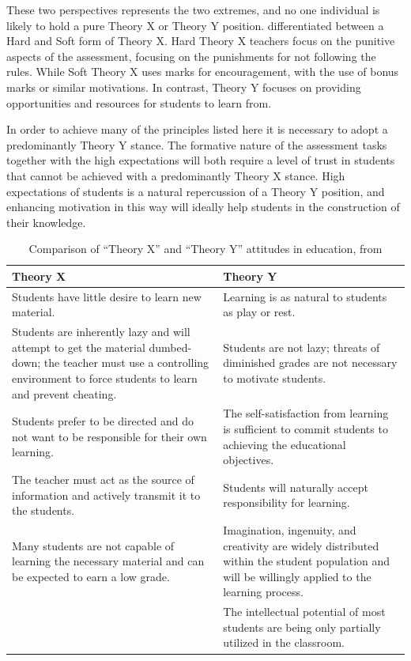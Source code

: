 These two perspectives represents the two extremes, and no one individual is likely to hold a pure Theory X or Theory Y position. \citet{Markwell:2004} differentiated between a Hard and Soft form of Theory X. Hard Theory X teachers focus on the punitive aspects of the assessment, focusing on the punishments for not following the rules. While Soft Theory X uses marks for encouragement, with the use of bonus marks or similar motivations. In contrast, Theory Y focuses on providing opportunities and resources for students to learn from.

In order to achieve many of the principles listed here it is necessary to adopt a predominantly Theory Y stance. The formative nature of the assessment tasks together with the high expectations will both require a level of trust in students that cannot be achieved with a predominantly Theory X stance. High expectations of students is a natural repercussion of a Theory Y position, and enhancing motivation in this way will ideally help students in the construction of their knowledge.

\begin{landscape}
 \renewcommand{\arraystretch}{1.6}
 \begin{table}[htbp]
 	\caption{Comparison of ``Theory X'' and ``Theory Y'' attitudes in education, from \citet{Markwell:2004}}
 	\label{tbl:theoryx_y}

    \begin{tabular}{p{4in}|p{4in}}
    \textbf{Theory X} & \textbf{Theory Y} \\
    \hline
    Students have little desire to learn new material. & Learning is as natural to students as play or rest. \\
    Students are inherently lazy and will attempt to get the material dumbed-down; the teacher must use a controlling environment to force students to learn and prevent cheating. & Students are not lazy; threats of diminished grades are not necessary to motivate students. \\
    Students prefer to be directed and do not want to be responsible for their own learning. & The self-satisfaction from learning is sufficient to commit students to achieving the educational objectives. \\
    The teacher must act as the source of information and actively transmit it to the students. & Students will naturally accept responsibility for learning. \\
    Many students are not capable of learning the necessary material and can be expected to earn a low grade. & Imagination, ingenuity, and creativity are widely distributed within the student population and will be willingly applied to the learning process. \\
    ~ & The intellectual potential of most students are being only partially utilized in the classroom. \\
    \end{tabular}
 \end{table}
\end{landscape}

